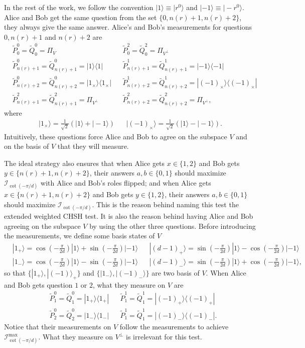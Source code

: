 \documentclass[11pt,letterpaper]{article}
\newcommand{\ket}[1]{|#1\rangle}
\newcommand{\ketbra}[2]{|#1\rangle\langle#2|}
\newcommand{\1}{\mathbb{1}}
\newcommand{\tP}{\tilde{P}}
\newcommand{\tQ}{\tilde{Q}}
\newcommand{\nr}{n(r)}
\newcommand{\I}{\mathcal{I}}
\theoremstyle{definition}
\begin{document}
In the rest of the work, we follow the 
convention $\ket{1} \equiv \ket{r^0}$
and $\ket{-1} \equiv \ket{-r^0}$.
Alice and Bob get the same question from the set $\{0,\nr+1,\nr+2\}$, they always give the same answer.
Alice's and Bob's measurements for questions $0, \nr+1$ and $\nr+2$ are
\begin{align*}
	&\tP_0^0 = \tQ_0^0 = \Pi_V && \tP_0^2 = \tQ_0^2 = \Pi_{V^\perp} \\
	&\tP_{\nr+1}^0 = \tQ_{\nr+1}^0 = \ketbra{1}{1} &&
	\tP_{\nr+1}^1 = \tQ_{\nr+1}^1 = \ketbra{-1}{-1} \\
	&\tP_{\nr+2}^0 = \tQ_{\nr+2}^0 = \ketbra{1_{\times}}{1_{\times}} && \tP_{\nr+2}^1 = \tQ_{\nr+2}^1 = \ketbra{(-1)_{\times}}{(-1)_{\times}} \\
	&\tP_{\nr+1}^2 = \tQ_{\nr+1}^2 = \Pi_{V^\perp} &&
	 \tP_{\nr+2}^2 = \tQ_{\nr+2}^2 = \Pi_{V^\perp},
\end{align*}
where
\begin{align*}
    \ket{1_{\times}} = \frac{1}{\sqrt{2}}(\ket{1} + \ket{-1})
	&&\ket{(-1)_{\times}} = \frac{1}{\sqrt{2}}(\ket{1} - \ket{-1}).
\end{align*}
Intuitively, these questions force Alice and Bob to agree on the subspace $V$ and
on the basis of $V$ that they will measure.

The ideal strategy also ensures that 
when Alice gets $x \in \{1,2\}$ and Bob gets $y \in \{\nr+1, \nr+2\}$, 
their answers $a,b \in \{0,1\}$ should maximize $\I_{\cot(-\pi/d)}$ with Alice and Bob's roles flipped;
and when Alice gets $x \in \{\nr+1,\nr+2\}$ and Bob gets $y \in \{1, 2\}$,
their answers $a,b \in \{0,1\}$ should maximize $\I_{\cot(-\pi/d)}$.
This is the reason behind naming this test the extended weighted CHSH test.
It is also the reason behind having Alice and Bob agreeing on the subspace $V$ 
by using the other three questions.
Before introducing the measurements, 
we define some basis states of $V$
\begin{align*}
	&\ket{1_+} = \cos(-\frac{\pi}{2d})\ket{1} + \sin(-\frac{\pi}{2d})\ket{-1}
	&&\ket{(d-1)_+} = \sin(-\frac{\pi}{2d})\ket{1} - \cos(-\frac{\pi}{2d})\ket{-1}\\
	&\ket{1_-} = \cos(-\frac{\pi}{2d})\ket{1} - \sin(-\frac{\pi}{2d})\ket{-1}
	&&\ket{(d-1)_-} = \sin(-\frac{\pi}{2d})\ket{1} + \cos(-\frac{\pi}{2d})\ket{-1},
\end{align*}
so that $\{\ket{1_+}, \ket{(-1)}_+\}$ and $\{\ket{1_-}, \ket{(-1)_-}\}$ are two basis
of $V$.
When Alice and Bob gets question $1$ or $2$, what they measure on $V$ are
\begin{align*}
	&\tP_1^0 = \tQ_1^0 =  \ketbra{1_+}{1_+} && \tP_1^1 = \tQ_1^1 =  \ketbra{(-1)_+}{(-1)_+}\\
	&\tP_2^0 = \tQ_2^0 =  \ketbra{1_-}{1_-} && \tP_1^1 = \tQ_1^1 =  \ketbra{(-1)_-}{(-1)_-}.
\end{align*}
Notice that their measurements on $V$ follow the measurements to achieve $\I_{\cot(-\pi/d)}^{\max}$.
What they measure on $V^\perp$ is irrelevant for this test.
\end{document}
